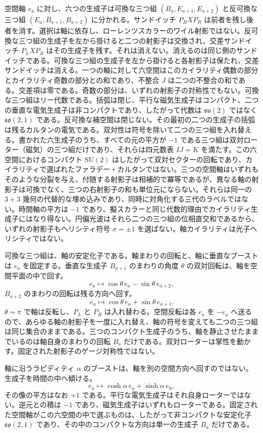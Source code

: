 \documentclass[a4paper]{article}
\begin{document}
空間軸 $e_a$ に対し、六つの生成子は可換な三つ組 $(B_a,E_{a+1},E_{a+2})$ と反可換な三つ組 $(E_a,B_{a+1},B_{a+2})$ に分かれる。サンドイッチ $P_R X P_R$ は前者を残し後者を消す。選択は軸に依存し、ローレンツスカラーのワイル射影ではない。反可換な三つ組の生成子を左から掛けると二つの射影子は交換され、交差サンドイッチ $P_L X P_R$ はその生成子を残す。それは消えない。消えるのは同じ側のサンドイッチである。可換な三つ組の生成子を左から掛けると各射影子は保たれ、交差サンドイッチは消える。一つの軸に対して六空間はこのカイラリティ偶数の部分とカイラリティ奇数の部分との和であり、不整合 $J$ は二つの不整合の和である。交差項は零である。奇数の部分は、いずれの射影子の対称性でもない。可換な三つ組はリー代数である。括弧は閉じ、平行な磁気生成子はコンパクト、二つの垂直な電気生成子は非コンパクトであり、したがって代数は $\mathfrak{su}(2)$ ではなく $\mathfrak{so}(2,1)$ である。反可換な補空間は閉じない。その最初の二つの生成子の括弧は残るカルタンの電気である。双対性は符号を除いて二つの三つ組を入れ替える。書かれた六生成子のうち、すべての元の平方が $-1$ である三つ組は双対ローター（磁気）の三つ組だけであり、それらは四元数表 $IJ=K$ を満たす。この六空間におけるコンパクト $\mathrm{SU}(2)$ はしたがって双対セクターの回転であり、カイラリティで選ばれたファラデー・カルタンではない。三つの空間軸はいずれもそのような分裂を与え、付随する射影子は相補的で冪等であるが、異なる軸の射影子は可換でなく、三つの右射影子の和も単位元にならない。それらは同一の $3+3$ 幾何の代替的な埋め込みであり、同時に対角化する三代のラベルではない。時間軸の平方は $-1$ であり、擬スカラーと同じ代数的理由でカイラリティ生成子にはなり得ない。円偏光波はそれら二つの三つ組の位相直交和であるから、いずれの射影子もヘリシティ符号 $\sigma=\pm 1$ を選ばない。軸カイラリティは光子ヘリシティではない。

可換な三つ組は、軸の安定化子である。軸まわりの回転と、軸に垂直なブーストは $e_a$ を固定する。垂直な生成子 $B_{a+1}$ のまわりの角度 $\theta$ の双対回転は、軸を空間平面の中で回す。
\[
e_a \mapsto \cos\theta\, e_a - \sin\theta\, e_{a+2},
\]
$B_{a+2}$ のまわりの回転は残る方向へ回す。
\[
e_a \mapsto \cos\theta\, e_a + \sin\theta\, e_{a+1}.
\]
$\theta=\pi$ で軸は反転し、$P_L$ と $P_R$ は入れ替わる。空間反転は各 $e_a$ を $-e_a$ へ送るので、あらゆる軸の射影子を一度に入れ替え、軸の符号を変えても二つの三つ組は同じ集合のままである。三つのコンパクト生成子のうち、軸を静止させたままでいるのは軸自身のまわりの回転 $B_a$ だけである。双対ローターは掌性を動かす。固定された射影子のゲージ対称性ではない。

軸に沿うラピディティ $\alpha$ のブーストは、軸を別の空間方向へ回すのではない。生成子を時間の中へ傾ける。
\[
e_a \mapsto \cosh\alpha\, e_a + \sinh\alpha\, e_0,
\]
その像の平方はなお $+1$ である。平行な電気生成子はそれ自身ローターではない。逆元との積は $-1$ であり、磁気生成子はいずれもローターである。固定された空間軸がこの六空間の中で選ぶものは、したがって非コンパクトな安定化子 $\mathfrak{so}(2,1)$ であり、その中のコンパクトな方向は単一の生成子 $B_a$ だけである。
\end{document}
